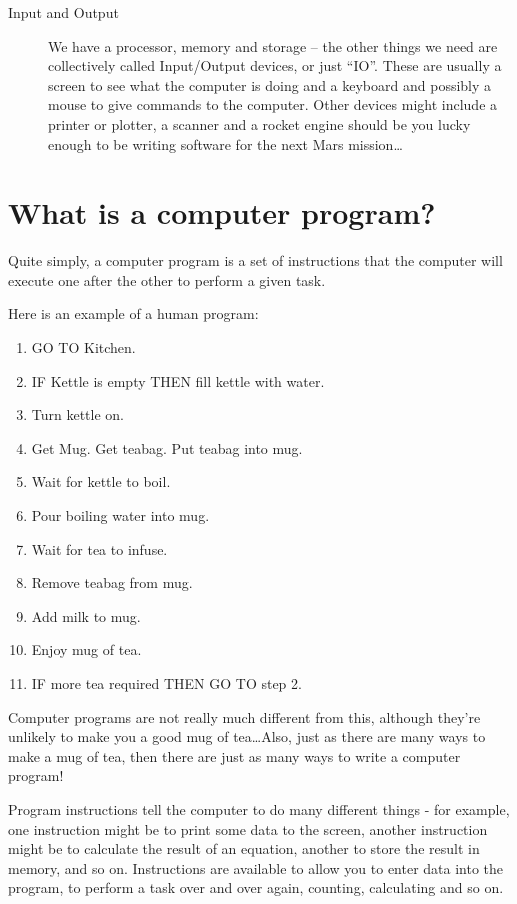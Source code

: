 \begin{description}
\item[Input and Output] We have a processor, memory and storage -- the
other things we need are collectively called Input/Output devices,
or just ``IO''. These are usually a screen to see what the computer
is doing and a keyboard and possibly a mouse to give commands to the
computer. Other devices might include a printer or plotter, a scanner
and a rocket engine should be you lucky enough to be writing software
for the next Mars mission\dots
\end{description}
 

\section{What is a computer program?}

Quite simply, a computer program is a set of instructions that the
computer will execute one after the other to perform a given task.

\noindent
Here is an example of a human program: 

\setcounter{teaMakePage}{\value{page}}
\begin{enumerate}
\item GO TO Kitchen.
\item IF Kettle is empty THEN fill kettle with water.
\item Turn kettle on.
\item Get Mug. Get teabag. Put teabag into mug.
\item Wait for kettle to boil.
\item Pour boiling water into mug.
\item Wait for tea to infuse.
\item Remove teabag from mug.
\item Add milk to mug.
\item Enjoy mug of tea.
\item IF more tea required THEN GO TO step 2.
\end{enumerate}

Computer programs are not really much different from this, although
they're unlikely to make you a good mug of tea\dots Also, just as there
are many ways to make a mug of tea, then there are just as many ways to
write a computer program!

Program instructions tell the computer to do many different things -
for example, one instruction might be to print some data to the screen,
another instruction might be to calculate the result of an equation,
another to store the result in memory, and so on. Instructions are available
to allow you to enter data into the program, to perform a task over and
over again, counting, calculating and so on.

